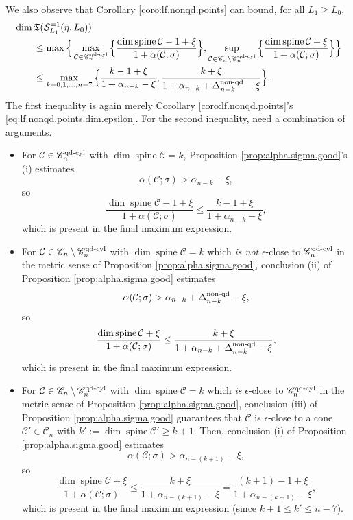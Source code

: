 \documentclass[11pt, letterpaper, reqno]{amsart}
\numberwithin{equation}{section}
\theoremstyle{remark}
\newcommand{\cC}{\mathcal{C}}
\newcommand{\cS}{\mathcal{S}}
\newcommand{\frT}{\mathfrak{T}}
\newcommand{\spine}{\operatorname{spine}}
\begin{document}
We also observe that Corollary \ref{coro:lf.nonqd.points} can bound, for all $L_1 \geq L_0$,
\begin{align} \label{eq:small.sing.dim.lf.nonqd.fixed}
		& \dim \frT(\cS^{=1}_{L_1}(\eta, L_0)) \nonumber \\
		& \qquad \leq \max \Big\{ \max_{\cC \in \mathscr{C}_{n}^{\textnormal{qd-cyl}}} \Big\{ \frac{\dim \spine \cC - 1 + \xi}{1 + \alpha(\cC; \sigma)} \Big\}, \sup_{\cC \in \mathscr{C}_n \setminus \mathscr{C}_n^{\textnormal{qd-cyl}}} \Big\{ \frac{\dim \spine \cC + \xi}{1 + \alpha(\cC; \sigma)} \Big\} \Big\} \nonumber \\
		& \qquad \leq \max_{k=0,1,\ldots,n-7} \Big\{ \frac{k - 1 + \xi}{1 + \alpha_{n-k} - \xi}, \frac{k + \xi}{1 + \alpha_{n-k} + \Delta_{n-k}^{\textnormal{non-qd}} - \xi} \Big\}.
\end{align}
The first inequality is again merely Corollary \ref{coro:lf.nonqd.points}'s \eqref{eq:lf.nonqd.points.dim.epsilon}. For the second inequality, need a combination of arguments. 
\begin{itemize}
	\item For $\cC \in \mathscr{C}_{n}^{\textnormal{qd-cyl}}$ with $\dim \spine \cC = k$, Proposition \ref{prop:alpha.sigma.good}'s (i) estimates
		\[ \alpha(\cC; \sigma) > \alpha_{n-k} - \xi, \]
		so
		\[ \frac{\dim \spine \cC - 1 + \xi}{1 + \alpha(\cC; \sigma)} \leq \frac{k-1+\xi}{1 + \alpha_{n-k} - \xi}, \]
		which is present in the final maximum expression.
	\item For $\cC \in \mathscr{C}_n \setminus \mathscr{C}_n^{\textnormal{qd-cyl}}$ with $\dim \spine \cC = k$ which \emph{is not} $\epsilon$-close to $\mathscr{C}_n^{\textnormal{qd-cyl}}$ in the metric sense of Proposition \ref{prop:alpha.sigma.good}, conclusion (ii) of Proposition \ref{prop:alpha.sigma.good} estimates
		\[ \alpha(\cC; \sigma) > \alpha_{n-k} + \Delta_{n-k}^{\textnormal{non-qd}} - \xi, \]
		so
		\[ \frac{\dim \spine \cC + \xi}{1 + \alpha(\cC; \sigma)} \leq \frac{k + \xi}{1 + \alpha_{n-k} + \Delta_{n-k}^{\textnormal{non-qd}} - \xi}, \]
		which is present in the final maximum expression.
	\item For $\cC \in \mathscr{C}_n \setminus \mathscr{C}_n^{\textnormal{qd-cyl}}$ with $\dim \spine \cC = k$ which \emph{is} $\epsilon$-close to $\mathscr{C}_n^{\textnormal{qd-cyl}}$ in the metric sense of Proposition \ref{prop:alpha.sigma.good}, conclusion (iii) of Proposition \ref{prop:alpha.sigma.good} guarantees that $\cC$ is $\epsilon$-close to a cone $\cC' \in \mathscr{C}_n$ with $k' := \dim \spine \cC' \geq k+1$. Then, conclusion (i) of Proposition \ref{prop:alpha.sigma.good} estimates
		\[ \alpha(\cC; \sigma) > \alpha_{n-(k+1)} - \xi, \]
		so
		\[ \frac{\dim \spine \cC + \xi}{1 + \alpha(\cC; \sigma)} \leq \frac{k + \xi}{1 + \alpha_{n-(k+1)} - \xi} = \frac{(k+1)-1 + \xi}{1 + \alpha_{n-(k+1)} - \xi}, \]
		which is present in the final maximum expression (since $k+1 \leq k' \leq n-7$).		
\end{itemize}
\end{document}
